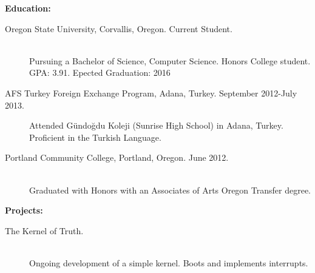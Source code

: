 \documentclass[11pt]{article}
\begin{document}
\bigskip

{\Large \bf Education:}
\begin{description}
	\item[Oregon State University, Corvallis, Oregon.
		\hfill Current Student.]
		\hfill \\
		Pursuing a Bachelor of Science, Computer Science. 
		Honors College student. GPA: 3.91. Epected Graduation: 2016
		
	\item[AFS Turkey Foreign Exchange Program, Adana, Turkey. 
		\hfill September 2012-July 2013.]
		Attended Gündoğdu Koleji (Sunrise High School) in Adana, 
		Turkey. Proficient in the Turkish Language.

	\item[Portland Community College, Portland, Oregon.
		\hfill June 2012.]
		\hfill \\
		Graduated with Honors with an Associates of Arts 
		Oregon Transfer degree.

\end{description}

\bigskip

{\Large \bf Projects:}
\begin{description}
	\item[The Kernel of Truth.]
		\hfill \\
		Ongoing development of a simple kernel. Boots and implements
		interrupts.

\end{description}
\end{document}
